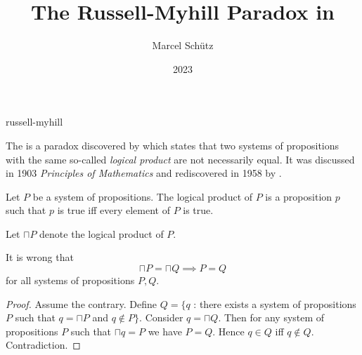 \documentclass{stex}
\begin{document}
\title{The Russell-Myhill Paradox in \Naproche}
\author{Marcel Schütz}
\date{2023}
\maketitle
\begin{smodule}{russell-myhill}
\begin{sparagraph}
  \noindent The \emph{} is a paradox discovered by  which states that two systems of propositions with the same so-called \emph{logical product} are not necessarily equal.
  It was discussed in  1903 \emph{Principles of Mathematics} \cite[Appendix B]{Russell1903} and rediscovered in 1958 by  \cite{Myhill1958}.
\end{sparagraph}

\begin{forthel}

  \begin{signature*}
    Let $P$ be a system of propositions.
    The logical product of $P$ is a proposition $p$ such that $p$ is true iff every element of $P$ is true.
  \end{signature*}

  Let $\sqcap P$ denote the logical product of $P$.

  \begin{theorem*}\label{russell_myhill_paradox}
    It is wrong that
    \[ \sqcap P = \sqcap Q \implies P = Q \]
    for all systems of propositions $P, Q$.
  \end{theorem*}
  \begin{proof}
    Assume the contrary.
    Define $Q = \{ q$ : there exists a system of propositions $P$ such that $q = \sqcap P$ and $q \notin P \}$.
    Consider $q = \sqcap Q$.
    Then for any system of propositions $P$ such that $\sqcap q = P$ we have $P = Q$.
    Hence $q \in Q$ iff $q \notin Q$.
    Contradiction.
  \end{proof}
\end{forthel}
\end{smodule}
\printbibliography
\end{document}
